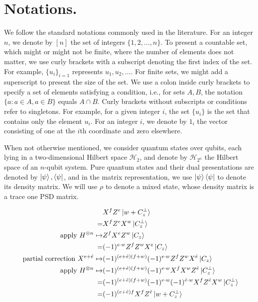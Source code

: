 
  \section{ Notations. } \label{sec:nota}
We follow the standard notations commonly used in the literature. For an integer $n$, we denote by $[n]$ the set of integers $\{1, 2, \ldots, n\}$. To present a countable set, which might or might not be finite, where the number of elements does not matter, we use curly brackets with a subscript denoting the first index of the set. For example, $\{u_{i}\}_{i=1}$ represents $u_{1}, u_{2}, \ldots$. For finite sets, we might add a superscript to present the size of the set. We use a colon inside curly brackets to specify a set of elements satisfying a condition, i.e., for sets $A, B$, the notation $\{ a : a \in A, a \in B \}$ equals $A \cap B$. Curly brackets without subscripts or conditions refer to singletons. For example, for a given integer $i$, the set $\{u_{i}\}$ is the set that contains only the element $u_{i}$. For an integer $i$, we denote by $1_{i}$ the vector consisting of one at the $i$th coordinate and zero elsewhere.

  When not otherwise mentioned, we consider quantum states over qubits, each lying in a two-dimensional Hilbert space $\mathcal{H}_{2}$, and denote by $\mathcal{H}_{2^n}$ the Hilbert space of an $n$-qubit system. Pure quantum states and their dual presentations are denoted by $\ket{\psi}, \bra{\psi}$, and in the matrix representation, we use $\ket{\psi}\bra{\psi}$ to denote its density matrix. We will use $\rho$ to denote a mixed state, whose density matrix is a trace one PSD matrix. 



\begin{equation*}
  \begin{split}
     & X^{f}Z^{e} \ket { w + C_{z}^{\perp} } \\
     = & X^{f}Z^{e}X^{w} \ket { C_{z}^{\perp} } \\
     \text{apply } H^{\otimes n } \mapsto & Z^{f}X^{e}Z^{w}\ket { C_{z} } \\
     = & (-1)^{e \cdot w} Z^{f}Z^{w}X^{e}\ket { C_{z} } \\
     \text{ partial correction } X^{e +\hat{e}} \mapsto & (-1)^{(e+\hat{e}) (f+w) } (-1)^{e \cdot w} Z^{f}Z^{w}X^{\hat{e}}\ket { C_{z} } \\
     \text{apply } H^{\otimes n } \mapsto & (-1)^{(e+\hat{e}) (f+w) } (-1)^{e \cdot w} X^{f}X^{w}Z^{\hat{e}}\ket { C_{z}^{\perp} } \\
     = & (-1)^{(e+\hat{e}) (f+w) } (-1)^{e \cdot w} (-1)^{\hat{e} \cdot w} X^{f}Z^{\hat{e}}X^{w}\ket { C_{z}^{\perp} } \\
     = & (-1)^{(e+\hat{e}) f } X^{f}Z^{\hat{e}}\ket { w + C_{z}^{\perp}  } \\
  \end{split}
\end{equation*}

